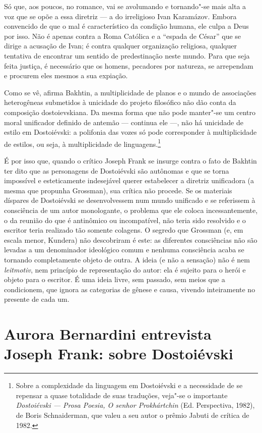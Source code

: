 Só que, aos poucos, no romance, vai se avolu­mando e tornando"-se mais
alta a voz que se opõe a essa diretriz --- a do irreligioso Ivan
Karamázov. Embora convencido de que o mal é característico da condição
humana, ele culpa a Deus por isso. Não é apenas contra a Roma Católica e
a ``espada de César'' que se dirige a acusação de Ivan; é contra
qualquer organização religiosa, qualquer tentativa de encontrar um
sentido de predestinação neste mundo. Para que seja feita justiça, é
necessário que os homens, pecadores por natureza, se arrependam e
procu­rem eles mesmos a sua expiação.

Como se vê, afirma Bakhtin, a multiplicidade de planos e o mundo de
associações heterogêneas submetidos à unicidade do projeto filosófico
não dão conta da composição dostoievskiana. Da mesma forma que não pode
manter"-se um centro moral unificador definido de antemão --- continua ele
---, não há unicidade de estilo em Dostoiévski: a polifonia das vozes só
pode corresponder à multiplicidade de estilos, ou seja, à multiplicidade
de linguagens.\footnote{Sobre a complexidade da linguagem em Dostoiévski
  e a necessidade de se repensar a quase totalidade de suas traduções,
  veja"-se o importante \emph{Dostoiévski --- Prosa Poesia, O senhor
  Prokhártchin} (Ed. Perspectiva, 1982), de Boris Schnaiderman, que
  valeu a seu autor o prêmio Jabuti de crítica de 1982.}

É por isso que, quando o crítico Joseph Frank se insurge contra o fato
de Bakhtin ter dito que as personagens de Dostoiévski são autônomas e
que se torna impossível e esteticamente indesejável querer estabelecer a
diretriz unificadora (a mesma que propunha Grossman), sua crítica não
procede. Se os materiais díspares de Dostoiévski se desenvolvessem num
mundo unificado e se referissem à consciência de um autor monologante, o
problema que ele coloca incessantemente, o da reunião do que é
antinômico ou incompatível, não teria sido resolvido e o escritor teria
realizado tão somente colagens. O segredo que Grossman (e, em escala
menor, Kundera) não descobriram é este: as diferentes consciências não
são levadas a um denominador ideológico comum e nenhuma consciência
acaba se tornando completamente objeto de outra. A ideia (e não a
sensação) não é nem \emph{leitmotiv}, nem princípio de representação do
autor: ela é sujeito para o herói e objeto para o escritor. É uma ideia
livre, sem passado, sem meios que a condicionem, que ignora as
categorias de gênese e causa, vivendo inteiramente no presente de cada
um.

\chapter*{Aurora Bernardini entrevista Joseph Frank: sobre Dostoiévski}

